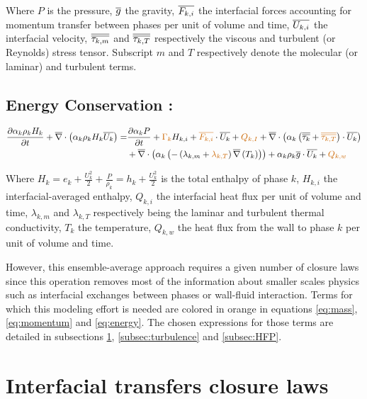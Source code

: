 Where $P$ is the pressure, $\overline{g}$ the gravity, $\overline{F_{k,i}}$ the interfacial forces accounting for momentum transfer between phases per unit of volume and time, $\overline{U_{k,i}}$ the interfacial velocity, $\overline{\overline{\tau_{k,m}}}$ and $\overline{\overline{\tau_{k,T}}}$ respectively the viscous and turbulent (or Reynolds) stress tensor. Subscript $m$ and $T$ respectively denote the molecular (or laminar) and turbulent terms.

\subsection{Energy Conservation :}

\begin{equation}
	\label{eq:energy}
\begin{aligned}
	\dtime{\alpha_{k}\rho_{k} H_{k}} + \divg{\alpha_{k}\rho_{k} H_{k}\vect{U_{k}}} =& \dtime{\alpha_{k}P} + \orangemath{\Gamma_{k}}H_{k,i}+\orangemath{\vect{F_{k,i}}}\cdot \vect{U_{k}} + \orangemath{Q_{k,I}} + \divg{\alpha_{k}\parth{ \tens{\tau_{k}} + \orangemath{\tens{\tau_{k,T}}} }\cdot \vect{U_{k}}}\\
	& + \divg{\alpha_{k} \parth{-\parth{ \lambda_{k,m}+\orangemath{\lambda_{k,T}}}\grad{T_{k}}}} + \alpha_{k}\rho_{k}\vect{g}\cdot \vect{U_{k}} + \orangemath{Q_{k,w}}
\end{aligned}
\end{equation}

Where $H_{k}=e_{k}+\frac{U_{k}^{2}}{2}+\frac{P}{\rho_{k}}=h_{k}+\frac{U_{k}^{2}}{2}$ is the total enthalpy of phase $k$, $H_{k,i}$ the interfacial-averaged enthalpy, $Q_{k,i}$ the interfacial heat flux per unit of volume and time, $\lambda_{k,m}$ and $\lambda_{k,T}$ respectively being the laminar and turbulent thermal conductivity, $T_{k}$ the temperature, $Q_{k,w}$ the heat flux from the wall to phase $k$ per unit of volume and time.


However, this ensemble-average approach requires a given number of closure laws since this operation removes most of the information about smaller scales physics such as interfacial exchanges between phases or wall-fluid interaction. Terms for which this modeling effort is needed are colored in orange in equations \ref{eq:mass}, \ref{eq:momentum} and \ref{eq:energy}. The chosen expressions for those terms are detailed in subsections \ref{subsec:int_transfers}, \ref{subsec:turbulence} and \ref{subsec:HFP}.

\section{Interfacial transfers closure laws}
\label{subsec:int_transfers}

